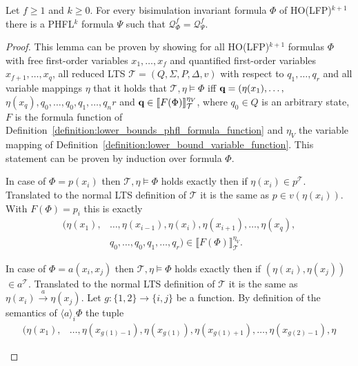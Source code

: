 \begin{lemma}
    \label{lemma:ho_lfp_equals_phfl}
    Let $f \geq 1$ and $k \geq 0$. For every bisimulation invariant formula $\Phi$ of HO(LFP)$^{k + 1}$ there is a
    PHFL$^k$ formula $\Psi$ such that $\mathcal{Q}_\Phi^f = \mathcal{Q}_\Psi^f$.
\end{lemma}

\begin{proof}
    This lemma can be proven by showing for all HO(LFP)$^{k+1}$ formulas $\Phi$ with free first-order variables $x_1,
    \dots, x_f$ and quantified first-order variables $x_{f+1}, \dots, x_q$, all reduced LTS $\mathcal{T} = (Q, \Sigma, P,
    \Delta, v)$ with respect to $q_1, \dots, q_r$ and all variable mappings $\eta$ that it holds that $\mathcal{T}, \eta \models \Phi$ iff $\emph{q} =
    (\eta(x_1), \dots, $ $\eta(x_q), q_0, \dots, q_0, q_1, \dots, q_nr$ and $\emph{q} \in \llbracket
   F(\Phi)\rrbracket^{\eta_V}_{\mathcal{T}}$, where $q_0
    \in Q$ is an arbitrary state, $F$ is the formula function of
    Definition~\ref{definition:lower_bounds_phfl_formula_function} and $\eta_V$ the variable mapping of
    Definition~\ref{definition:lower_bound_variable_function}. This statement can be proven by induction over formula
    $\Phi$.
    \begin{compactitem}
        \item In case of $\Phi = p(x_i)$ then $\mathcal{T}, \eta \models \Phi$ holds exactly then if $\eta(x_i) \in
        p^\mathcal{T}$. Translated to the normal LTS definition of $\mathcal{T}$ it is the same as $p \in v(\eta(x_i))$.
        With $F(\Phi) = p_i$ this is exactly
        \begin{align*}
            (\eta(x_1),& \dots, \eta(x_{i-1}), \eta(x_{i}), \eta(x_{i+1}), \dots, \eta(x_q),\\& q_0, \dots, q_0, q_1, \dots, q_r) \in
            \llbracket F(\Phi) \rrbracket^{\eta_V}_\mathcal{T}.
        \end{align*}
        \item In case of $\Phi = a(x_i, x_j)$ then $\mathcal{T}, \eta \models \Phi$ holds exactly then if $(\eta(x_i)
        , \eta(x_j))$ $ \in a^\mathcal{T}$. Translated to the normal LTS definition of $\mathcal{T}$ it is the same as $
        \eta(x_i) \overset{a}{\rightarrow} \eta(x_j)$. Let $g: \{1, 2\} \rightarrow \{i, j\}$ be a function.
        By  definition of the semantics of $\langle a \rangle_i \Phi$ the tuple
        \begin{align*}
            (\eta(x_1),& \dots, \eta(x_{g(1) - 1}), \eta(x_{g(1)}), \eta(x_{g(1)+1}), \dots, \eta(x_{g(2)-1}), \eta

\end{align*}
\end{compactitem}
\end{proof}
